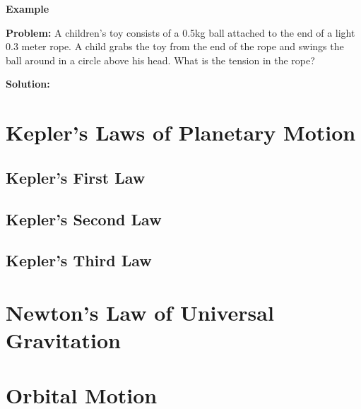 	
	\begin{mdframed}[backgroundcolor=blue!10!white]
		\begin{center}
			\textbf{Example \thesubsection}
		\end{center}
		\textbf{Problem:} A children's toy consists of a 0.5kg ball attached to the end of a light 0.3 meter rope.  A child grabs the toy from the end of the rope and swings the ball around in a circle above his head.  What is the tension in the rope? 
		
		\vspace{0.1in}
		
		\textbf{Solution:}
		
		\end{mdframed}
	
	
	\section{Kepler's Laws of Planetary Motion}
	\subsection{Kepler's First Law}
	\subsection{Kepler's Second Law}
	\subsection{Kepler's Third Law}
	
	
	
	
	
	\section{Newton's Law of Universal Gravitation}
	
	\section{Orbital Motion}
	

		


	


